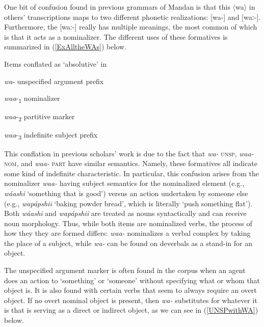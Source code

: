 One bit of confusion found in previous grammars of Mandan is that this $\langle$wa$\rangle$ in others' transcriptions maps to two different phonetic realizations: [wa-] and [waː-]. Furthermore, the [waː-] really has multiple meanings, the most common of which is that it acts as a nominalizer. The different uses of these formatives is summarized in (\ref{ExAlltheWAs}) below.

\begin{exe}

\item\label{ExAlltheWAs} Items conflated as `absolutive' in \citet{hollow1970}

	\begin{xlist}
	\item \textit{wa}- unspecified argument prefix
 	\item \textit{waa}-\textsubscript{1} nominalizer
	\item \textit{waa}-\textsubscript{2} partitive marker
	\item \textit{waa}-\textsubscript{3} indefinite subject prefix
	
	\end{xlist}

\end{exe}

This conflation in previous scholars' work is due to the fact that \textit{wa-} \textsc{unsp}, \textit{waa-} \textsc{nom}, and \textit{waa-} \textsc{part} have similar semantics. Namely, these formatives all indicate some kind of indefinite characteristic. In particular, this confusion arises from the nominalizer \textit{waa-} having subject semantics for the nominalized element (e.g., \textit{wáashi} `something that is good') versus an action undertaken by someone else  (e.g., \textit{wapápshii} `baking powder bread', which is literally `push something flat'). Both \textit{wáashi} and \textit{wapápshii} are treated as nouns syntactically and can receive noun morphology. Thus, while both items are nominalized verbs, the process of how they they are formed differs: \textit{waa-} nominalizes a verbal complex by taking the place of a subject, while \textit{wa-} can be found on deverbals as a stand-in for an object.

\label{SubSubSubSecUNSP}

The unspecified argument marker is often found in the corpus when an agent does an action to `something' or `someone' without specifying what or whom that object is.  It is also found with certain verbs that seem to always require an overt object. If no overt nominal object is present, then \textit{wa-} substitutes for whatever it is that is serving as a direct or indirect object, as we can see in (\ref{UNSPwithWA}) below.

